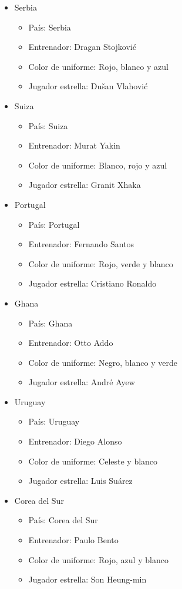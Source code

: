 \begin{itemize}
\begin{itemize}
        \end{itemize}
    \item Serbia
        \begin{itemize}
            \item País: Serbia
            \item Entrenador: Dragan Stojković
            \item Color de uniforme: Rojo, blanco y azul
            \item Jugador estrella: Dušan Vlahović
        \end{itemize}
    \item Suiza
        \begin{itemize}
            \item País: Suiza
            \item Entrenador: Murat Yakin
            \item Color de uniforme: Blanco, rojo y azul
            \item Jugador estrella: Granit Xhaka
        \end{itemize}
    \item Portugal
        \begin{itemize}
            \item País: Portugal
            \item Entrenador: Fernando Santos
            \item Color de uniforme: Rojo, verde y blanco
            \item Jugador estrella: Cristiano Ronaldo
        \end{itemize}
    \item Ghana
        \begin{itemize}
            \item País: Ghana
            \item Entrenador: Otto Addo
            \item Color de uniforme: Negro, blanco y verde
            \item Jugador estrella: André Ayew
        \end{itemize}
    \item Uruguay
        \begin{itemize}
            \item País: Uruguay
            \item Entrenador: Diego Alonso
            \item Color de uniforme: Celeste y blanco
            \item Jugador estrella: Luis Suárez
        \end{itemize}
    \item Corea del Sur
        \begin{itemize}
            \item País: Corea del Sur
            \item Entrenador: Paulo Bento
            \item Color de uniforme: Rojo, azul y blanco
            \item Jugador estrella: Son Heung-min
        \end{itemize}
\end{itemize}
